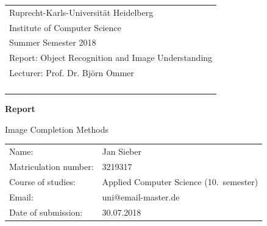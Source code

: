 \documentclass[
     11pt,         %
     a4paper,      %
     oneside,
     ]{article}
\makeatletter
\newcommand{\mytitle}{Image Completion Methods}
\newcommand{\myauthor}{Jan Sieber}
\newcommand{\myseminar}{Object Recognition and Image Understanding}
\newcommand{\mysemester}{Summer Semester 2018}
\newcommand{\mydozent}{Prof. Dr. Björn Ommer}
\newcommand{\mydozentTwo}{}
\newcommand{\mydozentThree}{}
\newcommand{\mydozentFour}{}
\newcommand{\mydozentFive}{}
\newcommand{\myMatrikelnummer}{3219317}
\newcommand{\myStudiengang}{Applied Computer Science }
\newcommand{\mySemester}{10}
\newcommand{\myEmail}{uni@email-master.de}
\newcommand{\generalDate}{30.07.2018}
\makeatother
\begin{document}
\begin{titlepage}
\begin{tabular}[l]{l}
Ruprecht-Karls-Universität Heidelberg\\
Institute of Computer Science\\
\mysemester\\
Report: \myseminar\\
Lecturer: \mydozent\\
\phantom{Dozenten: }\mydozentTwo\\
\phantom{Dozenten: }\mydozentThree\\
\phantom{Dozenten: }\mydozentFour\\
\phantom{Dozenten: }\mydozentFive\\
\end{tabular}

\vspace{4cm}
\begin{center}
\textbf{\large Report} %
\vspace{0.5\baselineskip}

{\huge
\mytitle
}
\end{center}

\vfill
\begin{tabular}[l]{ll}
Name:           & \myauthor\\
Matriculation number: & \myMatrikelnummer\\
Course of studies:    & \myStudiengang (\mySemester.\ semester)\\
Email: & \myEmail\\
Date of submission: & \generalDate \\
\end{tabular}

\end{titlepage}

\onehalfspacing



\hspace*{-1.5in}

\thispagestyle{empty}
\end{document}
